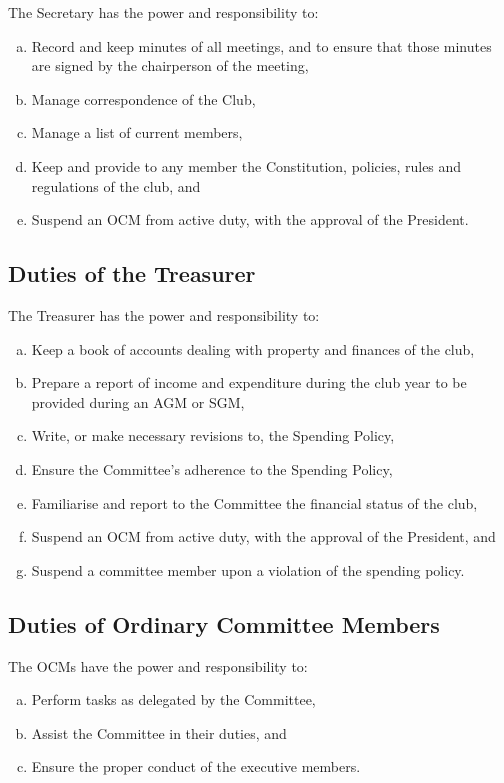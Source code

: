 \documentclass[a4paper,12pt]{article}
\begin{document}
The Secretary has the power and responsibility to:

\begin{enumerate}[a)]
	\item Record and keep minutes of all meetings, and to ensure that those minutes are signed by the chairperson of the meeting,
	\item Manage correspondence of the Club,
	\item Manage a list of current members,
	\item Keep and provide to any member the Constitution, policies, rules and regulations of the club, and
	\item Suspend an OCM from active duty, with the approval of the President.
\end{enumerate}

\subsection{Duties of the Treasurer}

The Treasurer has the power and responsibility to:

\begin{enumerate}[a)]
	\item Keep a book of accounts dealing with property and finances of the club,
	\item Prepare a report of income and expenditure during the club year to be provided during an AGM or SGM,
    \item Write, or make necessary revisions to, the Spending Policy,
	\item Ensure the Committee's adherence to the Spending Policy,
	\item Familiarise and report to the Committee the financial status of the club,
	\item Suspend an OCM from active duty, with the approval of the President, and
	\item Suspend a committee member upon a violation of the spending policy.
\end{enumerate}

\subsection{Duties of Ordinary Committee Members}

The OCMs have the power and responsibility to:

\begin{enumerate}[a)]
	\item Perform tasks as delegated by the Committee,
	\item Assist the Committee in their duties, and
	\item Ensure the proper conduct of the executive members.
\end{enumerate}
\end{document}

